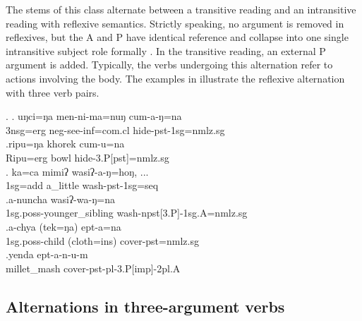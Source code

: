 The stems of this class alternate between a transitive reading and an intransitive reading with reflexive semantics. Strictly speaking, no argument is removed in reflexives, but the A and P have identical reference and collapse into one single intransitive subject role formally \citep[1134]{Haspelmath2004_Valency}. In the transitive reading, an external P argument is added. Typically, the verbs undergoing this alternation refer to actions involving the body. The examples in \Next  illustrate the reflexive alternation with three verb pairs. 

\ex. \ag. uŋci=ŋa men-ni-ma=nuŋ cum-a-ŋ=na\\
	 {\sc 3nsg=erg} {\sc neg-}see{\sc -inf=com.cl} hide{\sc -pst-1sg=nmlz.sg}	\\
 	\bg.ripu=ŋa khorek cum-u=na\\ 
	Ripu{\sc =erg} bowl hide{\sc -3.P[pst]=nmlz.sg}		\\
	\bg.            ka=ca         mimiʔ   wasiʔ-a-ŋ=hoŋ, ...\\
	{\sc 1sg=add} a\_little wash{\sc -pst-1sg=seq}\\
	  
	 \bg.a-nuncha wasiʔ-wa-ŋ=na\\ 
	{\sc 1sg.poss-}younger\_sibling wash{\sc -npst[3.P]-1sg.A=nmlz.sg}\\ 
\bg.a-chya (tek=ŋa) ept-a=na\\
	{\sc 1sg.poss-}child (cloth{\sc =ins}) cover{\sc [3sg]-pst=nmlz.sg}\\
\bg.yenda ept-a-n-u-m\\
millet\_mash cover{\sc -pst-pl-3.P[imp]-2pl.A}\\


\subsection{Alternations in three-argument verbs}\label{three-arg}

